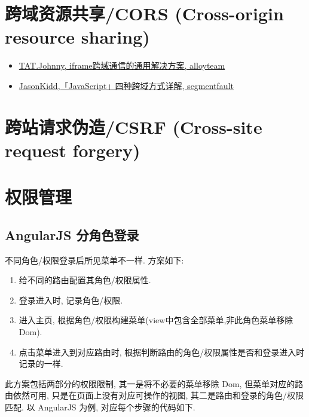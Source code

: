 \section{跨域资源共享/CORS (Cross-origin resource
sharing)}\label{ux8de8ux57dfux8d44ux6e90ux5171ux4eabcors-cross-origin-resource-sharing}

\begin{itemize}
\tightlist
\item
  \href{http://www.alloyteam.com/2013/11/the-second-version-universal-solution-iframe-cross-domain-communication/}{TAT.Johnny,
  iframe跨域通信的通用解决方案, alloyteam}
\item
  \href{http://segmentfault.com/a/1190000003642057}{JasonKidd,「JavaScript」四种跨域方式详解,
  segmentfault}
\end{itemize}

\section{跨站请求伪造/CSRF (Cross-site request
forgery)}\label{ux8de8ux7ad9ux8bf7ux6c42ux4f2aux9020csrf-cross-site-request-forgery}

\section{权限管理}\label{ux6743ux9650ux7ba1ux7406}

\subsection{AngularJS
分角色登录}\label{angularjs-ux5206ux89d2ux8272ux767bux5f55}

不同角色/权限登录后所见菜单不一样. 方案如下:

\begin{enumerate}
\def\labelenumi{\arabic{enumi}.}
\tightlist
\item
  给不同的路由配置其角色/权限属性.
\item
  登录进入时, 记录角色/权限.
\item
  进入主页, 根据角色/权限构建菜单(view中包含全部菜单,非此角色菜单移除
  Dom).
\item
  点击菜单进入到对应路由时,
  根据判断路由的角色/权限属性是否和登录进入时记录的一样.
\end{enumerate}

此方案包括两部分的权限限制, 其一是将不必要的菜单移除 Dom,
但菜单对应的路由依然可用, 只是在页面上没有对应可操作的视图,
其二是路由和登录的角色/权限匹配. 以 AngularJS 为例,
对应每个步骤的代码如下.


